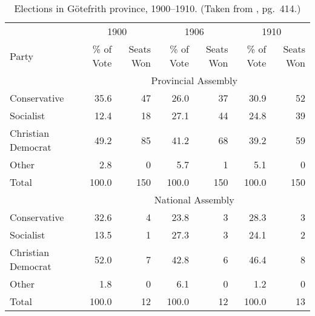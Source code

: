 \documentclass{mcmthesis}
\begin{document}
\begin{table}
\begin{center}
{\hspace{-1in}
\begin{minipage}{\textwidth}
\fontsize{10}{12}\selectfont
\begin{tabular}[c]{lrrrrrr}
\toprule
              & \multicolumn{2}{c}{1900} & \multicolumn{2}{c}{1906} & \multicolumn{2}{c}{1910}\\
\cmidrule(r){2-3}\cmidrule(lr){4-5}\cmidrule(l){6-7}
Party         & \% of Vote  & Seats Won  & \% of Vote  & Seats Won  & \% of Vote  & Seats Won \\
\midrule
\addlinespace
              & \multicolumn{6}{c}{Provincial Assembly}\\
\cmidrule{2-7}
Conservative  & 35.6        &  47        & 26.0        & 37         & 30.9        & 52\\
Socialist     & 12.4        &  18        & 27.1        & 44         & 24.8        & 39\\
Christian Democrat & 49.2   &  85        & 41.2        & 68         & 39.2        & 59\\
Other         & 2.8         &  0         & 5.7         & 1          & 5.1         & 0\\
\addlinespace
Total& 100.0       &  150       & 100.0       & 150        & 100.0       & 150\\
\addlinespace
              & \multicolumn{6}{c}{National Assembly}\\
\cmidrule{2-7}
Conservative  & 32.6        &   4        & 23.8        &  3         & 28.3        & 3\\
Socialist     & 13.5        &   1        & 27.3        &  3         & 24.1        & 2\\
Christian Democrat & 52.0   &   7        & 42.8        &  6         & 46.4        & 8\\
Other         & 1.8         &   0        & 6.1         &  0         & 1.2         & 0\\
\addlinespace
Total& 100.0       &  12        & 100.0       & 12         & 100.0       & 13\\
\bottomrule
\end{tabular}
\end{minipage}
}
\caption[Elections in G\"{o}tefrith province, 1900--1910]{Elections in
  G\"{o}tefrith province, 1900--1910.  (Taken from \cite{chicago},
  pg.~414.)}%
\label{tab:chicago-table}
\end{center}
\end{table}
\end{document}
